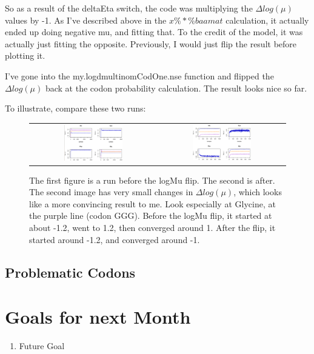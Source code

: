So as a result of the deltaEta switch, the code was multiplying the $\Delta log(\mu)$ values by -1. As I've described above in the $x \%*\% baamat$ calculation, it actually ended up doing negative mu, and fitting that. To the credit of the model, it was actually just fitting the opposite. Previously, I would just flip the result before plotting it.

I've gone into the my.logdmultinomCodOne.nse function and flipped the $\Delta log(\mu)$ back at the codon probability calculation. The result looks nice so far.

To illustrate, compare these two runs:

\begin{figure}[h!]
\caption{The first figure is a run before the logMu flip. The second is after. The second image has very small changes in $\Delta log(\mu)$, which looks like a more convincing result to me. Look especially at Glycine, at the purple line (codon GGG). Before the logMu flip, it started at about -1.2, went to 1.2, then converged around 1. After the flip, it started around -1.2, and converged around -1.}
\begin{tabular}{c|c}
\includegraphics[width=0.48\textwidth]{data/logmu-nomflip.png}
&
\includegraphics[width=0.48\textwidth]{data/logmu-mflip.png}
\end{tabular}
\end{figure}



\subsection{Problematic Codons}




\section{Goals for next Month}
\begin{enumerate}
\item Future Goal
\end{enumerate}


